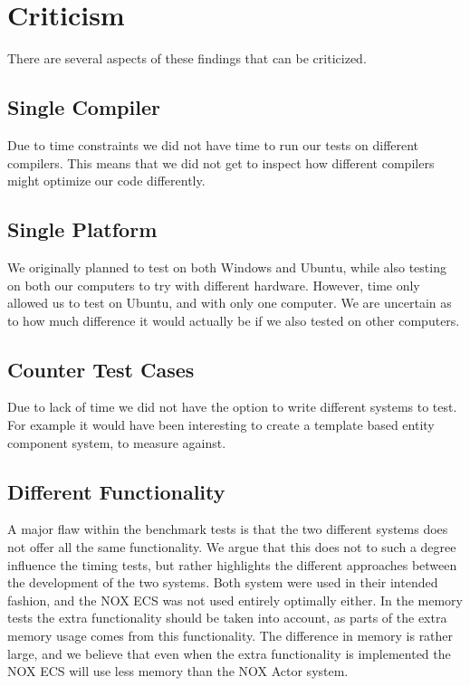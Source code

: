 \section{Criticism}
\label{sec:discussion_criticism}
There are several aspects of these findings that can be criticized.

\subsection{Single Compiler}
Due to time constraints we did not have time to run our tests on different compilers.
This means that we did not get to inspect how different compilers might optimize our code differently.

\subsection{Single Platform}
We originally planned to test on both Windows and Ubuntu, while also testing on both our computers to
try with different hardware. However, time only allowed us to test on Ubuntu, and with only one computer.
We are uncertain as to how much difference it would actually be if we also tested on other computers.

\subsection{Counter Test Cases}
Due to lack of time we did not have the option to write different systems to test.
For example it would have been interesting to create a template based entity component system,
to measure against.

\subsection{Different Functionality}
A major flaw within the benchmark tests is that the two different systems does not offer all the same functionality.
We argue that this does not to such a degree influence the timing tests, but rather highlights the different approaches
between the development of the two systems.
Both system were used in their intended fashion, and the NOX ECS was not used entirely optimally either.
In the memory tests the extra functionality should be taken into account, as parts of the extra memory usage
comes from this functionality.
The difference in memory is rather large, and we believe that even when the extra functionality is implemented
the NOX ECS will use less memory than the NOX Actor system.

